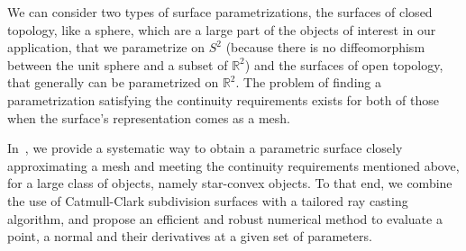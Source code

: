 We can consider two types of surface parametrizations, the surfaces of closed topology, like a sphere, which are a large part of the objects of interest in our application, that we parametrize on $S^2$ (because there is no diffeomorphism between the unit sphere and a subset of $\mathbb{R}^2$) and the surfaces of open topology, that generally can be parametrized on $\mathbb{R}^2$.
The problem of finding a parametrization satisfying the continuity requirements exists for both of those when the surface's representation comes as a mesh.

In~\cite{escande:icra:2016}, we provide a systematic way to obtain a parametric surface closely approximating a mesh and meeting the continuity requirements mentioned above, for a large class of objects, namely star-convex objects.
To that end, we combine the use of Catmull-Clark subdivision surfaces with a tailored ray casting algorithm, and propose an efficient and robust numerical method to evaluate a point, a normal and their derivatives at a given set of parameters.

